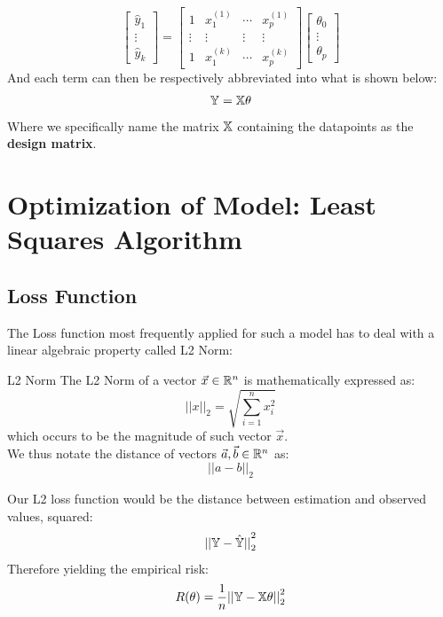 \[
    \begin{bmatrix} \hat{y}_1 \\ \vdots \\ \hat{y}_k \end{bmatrix} =
    \begin{bmatrix} 
        1 & x_1^{(1)} & \cdots & x_p^{(1)} \\
        \vdots & \vdots & \vdots & \vdots \\
        1 & x_1^{(k)} & \cdots & x_p^{(k)}
    \end{bmatrix}
    \begin{bmatrix} \theta_0 \\ \vdots \\ \theta_p \end{bmatrix}
\]
And each term can then be respectively abbreviated into what is shown below:
\[\mathbb{Y} = \mathbb{X} \theta\]
Where we specifically name the matrix $\mathbb{X}$ containing the datapoints as the \textbf{design matrix}.

\section{Optimization of Model: Least Squares Algorithm}

\subsection{Loss Function}
The Loss function most frequently applied for such a model has to deal with a linear algebraic property called L2 Norm:
\begin{ln-define}{L2 Norm}{}
    The L2 Norm of a vector $\vec{x} \in \mathbb{R}^n$ is mathematically expressed as:
    \[{||x||}_2 = \sqrt{\sum_{i = 1}^n x_i^2}\]
    which occurs to be the magnitude of such vector $\vec{x}$. \\
    We thus notate the distance of vectors $\vec{a}, \vec{b} \in \mathbb{R}^n$ as:
    \[{||a - b||}_2\]
\end{ln-define}
Our L2 loss function would be the distance between estimation and observed values, squared:
\[{||\mathbb{Y} - \hat{\mathbb{Y}}||}_2^2\]
Therefore yielding the empirical risk:
\[R(\theta) = \frac{1}{n} {||\mathbb{Y} - \mathbb{X} \theta||}_2^2\]

